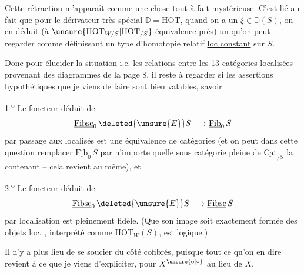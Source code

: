 Cette rétraction m'apparaît comme une chose tout à fait mystérieuse.  C'est lié au fait que pour le dérivateur très spécial $\mathbb D=\mathrm{HOT}$,
quand on a un $\xi\in\mathbb D(S)$, on en déduit  (à $\unsure{\mathrm{HOT}_{W/S}|\mathrm{HOT}_{/S}}$-équivalence près) un \deleted{$\unsure{\xi}$}   
qu'on peut regarder   comme définissant un type d'homotopie relatif \uline{loc constant} sur $S$.

Donc pour élucider la situation i.e. les relations entre les 13 catégories localisées provenant des diagrammes de la page 8, il reste à regarder si les assertions hypothétiques que je viens de faire sont bien valables, savoir

\textcircled{\scriptsize 1\textsuperscript{o}} Le foncteur déduit de
\[
 \underline{\mathrm{Fibsc}}_0\,\deleted{\unsure{E}}S\longrightarrow\underline{\mathrm{Fib}}_0\,S
\]
par passage aux localisés est une équivalence de catégories (et on peut dans cette question remplacer $\underline{\mathrm{Fib}}_0\,S$ par n'importe quelle  sous catégorie pleine de $\underline{\mathrm{Cat}}_{/S}$ la contenant -- cela revient au même), et

\textcircled{\scriptsize 2\textsuperscript{o}} Le foncteur déduit de
\[
 \underline{\mathrm{Fibsc}}_0\,\deleted{\unsure{E}}S\longrightarrow\underline{\mathrm{Fibsc}}\,S
\]
par localisation est pleinement fidèle. (Que son image  soit exactement formée des objets loc.   , interprété comme $\mathrm{HOT}_W(S)$, est  logique.)

Il n'y a plus lieu de se soucier du côté
cofibrés, puisque tout ce qu'on  en dire revient à ce que je viens d'expliciter, pour $X^{\unsure{\mathrm o|\circ}}$ au lieu de $X$.

